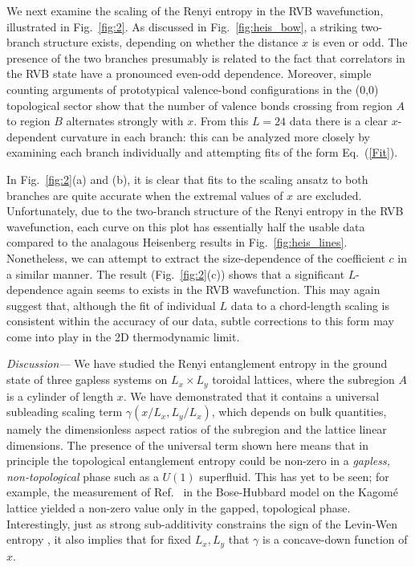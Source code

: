 \documentclass[prl,aps,twocolumn,floatfix,amsmath,amssymb,superscriptaddress,tightenlines]{revtex4}
\begin{document}
We next examine the scaling of the Renyi entropy in the RVB wavefunction, illustrated in Fig.~{\ref{fig:2}}.  
As discussed in Fig.~\ref{fig:heis_bow}, a striking two-branch structure exists, depending on whether the distance $x$ is even or odd.
The presence of the two branches presumably is related to the fact that correlators in the RVB state have a pronounced even-odd dependence. Moreover, simple counting arguments of prototypical valence-bond configurations in the (0,0) topological sector \cite{RVB1,RVB2} show that the number of valence bonds crossing from region $A$ to region $B$ alternates strongly with $x$.  From this $L=24$ data there is a clear $x$-dependent curvature in each branch: this can be analyzed more closely by examining each branch individually and attempting fits of the form Eq.~(\ref{Fit}).  

In Fig.~{\ref{fig:2}}(a) and (b), it is clear that fits to the scaling ansatz to both branches are quite accurate when the extremal values of $x$ are excluded.   Unfortunately, due to the two-branch structure of the Renyi entropy in the RVB wavefunction, each curve on this plot has essentially half the usable data compared to the analagous Heisenberg results in Fig.~\ref{fig:heis_lines}.  Nonetheless, we can attempt to extract the size-dependence of the coefficient $c$ in a similar manner.  The result (Fig.~\ref{fig:2}(c)) shows that a significant $L$-dependence again seems to exists in the RVB wavefunction.  This may again suggest that, although the fit of individual $L$ data to a chord-length scaling is consistent within the accuracy of our data, subtle corrections to this form may come into play in the 2D thermodynamic limit.

{\it Discussion---} We have studied the Renyi entanglement entropy in the ground state of three gapless systems on $L_x\times L_y$ toroidal lattices, where the subregion $A$ is a cylinder of length $x$.  We have  
demonstrated that it contains a universal subleading scaling term $\gamma(x/L_x,L_y/L_x)$, which depends on bulk quantities, namely the dimensionless aspect ratios of the subregion and the lattice linear dimensions.  The presence of the universal term shown here means that in principle the topological entanglement entropy\cite{LW,KP} could be non-zero in a {\it gapless, non-topological} phase such as a $U(1)$ superfluid. This has yet to be seen; for example, the measurement of Ref.\ 
   in the Bose-Hubbard model on the Kagom\'e lattice yielded a non-zero value only in the {gapped, topological} phase.  Interestingly, just as strong sub-additivity constrains the sign of the Levin-Wen entropy \cite{LW}, it also implies that for fixed $L_x,L_y$ that $\gamma$ is a concave-down function of $x$.
\end{document}
